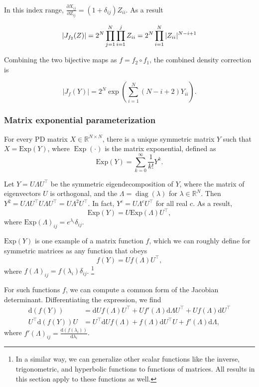 \documentclass[11pt]{article}
\newcommand{\abs}[1]{\left| #1 \right|}
\newcommand{\absdet}[1]{\abs{#1}}
\newcommand{\dv}[1]{\mathrm{d}{#1}}
\newcommand{\Exp}{\mathrm{Exp}}
\begin{document}
In this index range, $\frac{\partial X_{ij}}{\partial Z_{ij}} = (1 + \delta_{ij}) Z_{ii}$.
As a result

\[
  \absdet{J_{f_2}(Z)} = 2^N \prod_{j = 1}^N \prod_{i = 1}^j Z_{ii} = 2^N \prod_{i=1}^N |Z_{ii}|^{N - i + 1} \\
\]

Combining the two bijective maps as $f = f_2 \circ f_1$, the combined density correction is

\[
  \absdet{J_{f}(Y)} = 2^N \exp\left( \sum_{i=1}^N (N - i + 2) Y_{ii}\right).
\]

\subsubsection{Matrix exponential parameterization}

For every PD matrix $X \in \mathbb{R}^{N \times N}$, there is a unique symmetric matrix $Y$ such that $X = \Exp(Y)$, where $\operatorname{Exp}(\cdot)$ is the matrix exponential, defined as
\[\Exp(Y) = \sum_{k=0}^\infty \frac{1}{k!} Y^k.\]

Let $Y = U \Lambda U^\top$ be the symmetric eigendecomposition of $Y$, where the matrix of eigenvectors $U$ is orthogonal, and the $\Lambda = \operatorname{diag}(\lambda)$ for $\lambda \in \mathbb{R}^N$.
Then $Y^2 = U \Lambda U^\top U \Lambda U^\top = U \Lambda^2 U^\top$.
In fact, $Y^c = U \Lambda^c U^\top$ for all real $c$.
As a result,
\[\Exp(Y) = U \Exp(\Lambda) U^\top,\]
where $\Exp(\Lambda)_{ij} = e^{\lambda_i} \delta_{ij}$.

$\Exp(Y)$ is one example of a matrix function $f$, which we can roughly define for symmetric matrices as any function that obeys
\[f(Y) = U f(\Lambda) U^\top,\]
where $f(\Lambda)_{ij} = f(\lambda_i)\delta_{ij}$.
\footnote{
  In a similar way, we can generalize other scalar functions like the inverse, trigonometric, and hyperbolic functions to functions of matrices.
  All results in this section apply to these functions as well.
}

For such functions $f$, we can compute a common form of the Jacobian determinant.
Differentiating the expression, we find
\[
\begin{aligned}
  \dv{(f(Y))} &= \dv{U} f(\Lambda) U^\top + U f'(\Lambda) \dv{\Lambda} U^\top + U f(\Lambda) \dv{U}^\top\\
  U^\top \dv{(f(Y))} U &= U^\top \dv{U} f(\Lambda) + f(\Lambda) \dv{U}^\top U + f'(\Lambda)\dv{\Lambda},
\end{aligned}
\]
where $f'(\Lambda)_{ij} = \frac{\dv{(f(\lambda_i))}}{\dv{\lambda_i}}$.
\end{document}
